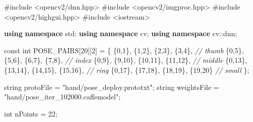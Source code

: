 \documentclass[
  12pt,
  a4paper,
]{article}
\newenvironment{Shaded}{}{}
\newcommand{\AttributeTok}[1]{\textcolor[rgb]{0.49,0.56,0.16}{#1}}
\newcommand{\CommentTok}[1]{\textcolor[rgb]{0.38,0.63,0.69}{\textit{#1}}}
\newcommand{\DataTypeTok}[1]{\textcolor[rgb]{0.56,0.13,0.00}{#1}}
\newcommand{\DecValTok}[1]{\textcolor[rgb]{0.25,0.63,0.44}{#1}}
\newcommand{\ImportTok}[1]{#1}
\newcommand{\KeywordTok}[1]{\textcolor[rgb]{0.00,0.44,0.13}{\textbf{#1}}}
\newcommand{\NormalTok}[1]{#1}
\newcommand{\PreprocessorTok}[1]{\textcolor[rgb]{0.74,0.48,0.00}{#1}}
\newcommand{\StringTok}[1]{\textcolor[rgb]{0.25,0.44,0.63}{#1}}
\begin{document}
\begin{Shaded}
\begin{Highlighting}[numbers=left,,]
\PreprocessorTok{\#include }\ImportTok{\textless{}opencv2/dnn.hpp\textgreater{}}
\PreprocessorTok{\#include }\ImportTok{\textless{}opencv2/imgproc.hpp\textgreater{}}
\PreprocessorTok{\#include }\ImportTok{\textless{}opencv2/highgui.hpp\textgreater{}}
\PreprocessorTok{\#include }\ImportTok{\textless{}iostream\textgreater{}}

\KeywordTok{using} \KeywordTok{namespace}\NormalTok{ std;}
\KeywordTok{using} \KeywordTok{namespace}\NormalTok{ cv;}
\KeywordTok{using} \KeywordTok{namespace}\NormalTok{ cv::dnn;}


\AttributeTok{const} \DataTypeTok{int}\NormalTok{ POSE\_PAIRS[}\DecValTok{20}\NormalTok{][}\DecValTok{2}\NormalTok{] =}
\NormalTok{\{}
\NormalTok{    \{}\DecValTok{0}\NormalTok{,}\DecValTok{1}\NormalTok{\}, \{}\DecValTok{1}\NormalTok{,}\DecValTok{2}\NormalTok{\}, \{}\DecValTok{2}\NormalTok{,}\DecValTok{3}\NormalTok{\}, \{}\DecValTok{3}\NormalTok{,}\DecValTok{4}\NormalTok{\},         }\CommentTok{// thumb}
\NormalTok{    \{}\DecValTok{0}\NormalTok{,}\DecValTok{5}\NormalTok{\}, \{}\DecValTok{5}\NormalTok{,}\DecValTok{6}\NormalTok{\}, \{}\DecValTok{6}\NormalTok{,}\DecValTok{7}\NormalTok{\}, \{}\DecValTok{7}\NormalTok{,}\DecValTok{8}\NormalTok{\},         }\CommentTok{// index}
\NormalTok{    \{}\DecValTok{0}\NormalTok{,}\DecValTok{9}\NormalTok{\}, \{}\DecValTok{9}\NormalTok{,}\DecValTok{10}\NormalTok{\}, \{}\DecValTok{10}\NormalTok{,}\DecValTok{11}\NormalTok{\}, \{}\DecValTok{11}\NormalTok{,}\DecValTok{12}\NormalTok{\},    }\CommentTok{// middle}
\NormalTok{    \{}\DecValTok{0}\NormalTok{,}\DecValTok{13}\NormalTok{\}, \{}\DecValTok{13}\NormalTok{,}\DecValTok{14}\NormalTok{\}, \{}\DecValTok{14}\NormalTok{,}\DecValTok{15}\NormalTok{\}, \{}\DecValTok{15}\NormalTok{,}\DecValTok{16}\NormalTok{\},  }\CommentTok{// ring}
\NormalTok{    \{}\DecValTok{0}\NormalTok{,}\DecValTok{17}\NormalTok{\}, \{}\DecValTok{17}\NormalTok{,}\DecValTok{18}\NormalTok{\}, \{}\DecValTok{18}\NormalTok{,}\DecValTok{19}\NormalTok{\}, \{}\DecValTok{19}\NormalTok{,}\DecValTok{20}\NormalTok{\}   }\CommentTok{// small}
\NormalTok{\};}

\NormalTok{string protoFile = }\StringTok{"hand/pose\_deploy.prototxt"}\NormalTok{;}
\NormalTok{string weightsFile = }\StringTok{"hand/pose\_iter\_102000.caffemodel"}\NormalTok{;}

\DataTypeTok{int}\NormalTok{ nPoints = }\DecValTok{22}\NormalTok{;}


\end{Highlighting}
\end{Shaded}
\end{document}
